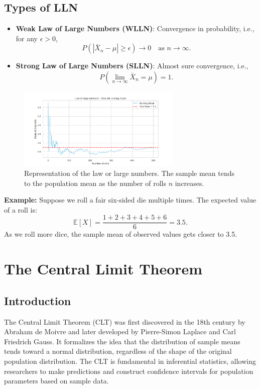 \documentclass{book}
\begin{document}
\subsection{Types of LLN}
\begin{itemize}
    \item \textbf{Weak Law of Large Numbers (WLLN)}: Convergence in probability, i.e., for any $\epsilon > 0$, 
    \begin{equation}
        P(|\bar{X}_n - \mu| \geq \epsilon) \to 0 \quad \text{as } n \to \infty.
    \end{equation}
    \item \textbf{Strong Law of Large Numbers (SLLN)}: Almost sure convergence, i.e.,
    \begin{equation}
        P\left( \lim_{n \to \infty} \bar{X}_n = \mu \right) = 1.
    \end{equation}
\end{itemize}

\begin{figure}[ht]
    \centering
    \includegraphics[width=0.7\textwidth]{figures/chapter3/law_large_numbers.png}
    \caption{Representation of the law or large numbers. The sample mean tends to the population mean as the number of rolls $n$ increases.}
    \label{fig:random}
\end{figure}

\textbf{Example:} Suppose we roll a fair six-sided die multiple times. The expected value of a roll is:
\begin{equation}
    \mathbb{E}[X] = \frac{1+2+3+4+5+6}{6} = 3.5.
\end{equation}
As we roll more dice, the sample mean of observed values gets closer to 3.5.

\newpage

\section{The Central Limit Theorem}

\subsection*{Introduction}
The Central Limit Theorem (CLT) was first discovered in the 18th century by Abraham de Moivre and later developed by Pierre-Simon Laplace and Carl Friedrich Gauss. It formalizes the idea that the distribution of sample means tends toward a normal distribution, regardless of the shape of the original population distribution. The CLT is fundamental in inferential statistics, allowing researchers to make predictions and construct confidence intervals for population parameters based on sample data.
\end{document}
